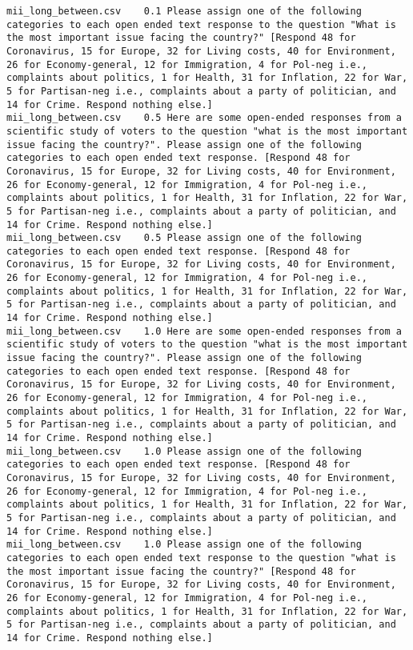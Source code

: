 \begin{lstlisting}[label=lst:promptvariants]
mii_long_between.csv	0.1	Please assign one of the following categories to each open ended text response to the question "What is the most important issue facing the country?" [Respond 48 for Coronavirus, 15 for Europe, 32 for Living costs, 40 for Environment, 26 for Economy-general, 12 for Immigration, 4 for Pol-neg i.e., complaints about politics, 1 for Health, 31 for Inflation, 22 for War, 5 for Partisan-neg i.e., complaints about a party of politician, and 14 for Crime. Respond nothing else.]
mii_long_between.csv	0.5	Here are some open-ended responses from a scientific study of voters to the question "what is the most important issue facing the country?". Please assign one of the following categories to each open ended text response. [Respond 48 for Coronavirus, 15 for Europe, 32 for Living costs, 40 for Environment, 26 for Economy-general, 12 for Immigration, 4 for Pol-neg i.e., complaints about politics, 1 for Health, 31 for Inflation, 22 for War, 5 for Partisan-neg i.e., complaints about a party of politician, and 14 for Crime. Respond nothing else.]
mii_long_between.csv	0.5	Please assign one of the following categories to each open ended text response. [Respond 48 for Coronavirus, 15 for Europe, 32 for Living costs, 40 for Environment, 26 for Economy-general, 12 for Immigration, 4 for Pol-neg i.e., complaints about politics, 1 for Health, 31 for Inflation, 22 for War, 5 for Partisan-neg i.e., complaints about a party of politician, and 14 for Crime. Respond nothing else.]
mii_long_between.csv	1.0	Here are some open-ended responses from a scientific study of voters to the question "what is the most important issue facing the country?". Please assign one of the following categories to each open ended text response. [Respond 48 for Coronavirus, 15 for Europe, 32 for Living costs, 40 for Environment, 26 for Economy-general, 12 for Immigration, 4 for Pol-neg i.e., complaints about politics, 1 for Health, 31 for Inflation, 22 for War, 5 for Partisan-neg i.e., complaints about a party of politician, and 14 for Crime. Respond nothing else.]
mii_long_between.csv	1.0	Please assign one of the following categories to each open ended text response. [Respond 48 for Coronavirus, 15 for Europe, 32 for Living costs, 40 for Environment, 26 for Economy-general, 12 for Immigration, 4 for Pol-neg i.e., complaints about politics, 1 for Health, 31 for Inflation, 22 for War, 5 for Partisan-neg i.e., complaints about a party of politician, and 14 for Crime. Respond nothing else.]
mii_long_between.csv	1.0	Please assign one of the following categories to each open ended text response to the question "what is the most important issue facing the country?" [Respond 48 for Coronavirus, 15 for Europe, 32 for Living costs, 40 for Environment, 26 for Economy-general, 12 for Immigration, 4 for Pol-neg i.e., complaints about politics, 1 for Health, 31 for Inflation, 22 for War, 5 for Partisan-neg i.e., complaints about a party of politician, and 14 for Crime. Respond nothing else.]

\end{lstlisting}
